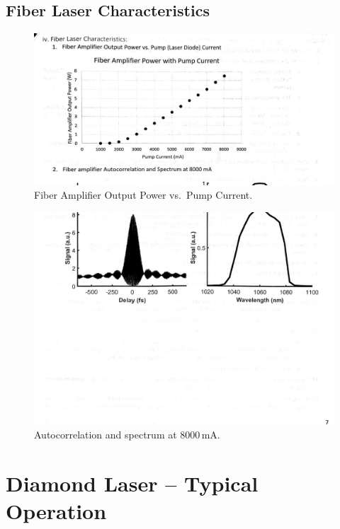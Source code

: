 \documentclass{article}
\begin{document}
\subsection{Fiber Laser Characteristics}
\begin{figure}[ht]
  \centering
  \includegraphics[width=0.8\linewidth]{fiber_power_curve.png}
  \caption{Fiber Amplifier Output Power vs.\ Pump Current.}
\end{figure}
\begin{figure}[ht]
  \centering
  \includegraphics[width=0.8\linewidth]{fiber_autocorr_spectrum_8000mA.png}
  \caption{Autocorrelation and spectrum at 8000\,mA.}
\end{figure}

\section{Diamond Laser -- Typical Operation}
\end{document}
